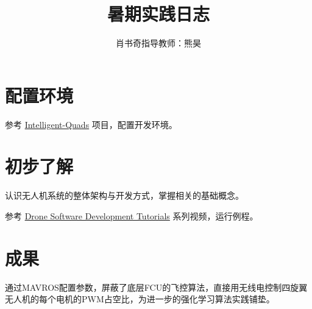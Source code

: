 \documentclass{tufte-handout}
\title{暑期实践日志}
\author{肖书奇\quad 指导教师：熊昊}
\date{} %
\begin{document}
\maketitle
\section{配置环境}
\par 参考 \href{https://github.com/Intelligent-Quads/iq_tutorials}{Intelligent-Quads} 项目，配置开发环境。
\section{初步了解}
\par 认识无人机系统的整体架构与开发方式，掌握相关的基础概念。
\par 参考 \href{https://www.youtube.com/channel/UCuZy0c-uvSJglnZfQC0-uaQ}{Drone Software Development Tutorials} 系列视频，运行例程。
\section{成果}
通过MAVROS配置参数，屏蔽了底层FCU的飞控算法，直接用无线电控制四旋翼无人机的每个电机的PWM占空比，为进一步的强化学习算法实践铺垫。
\printindex
\end{document}
